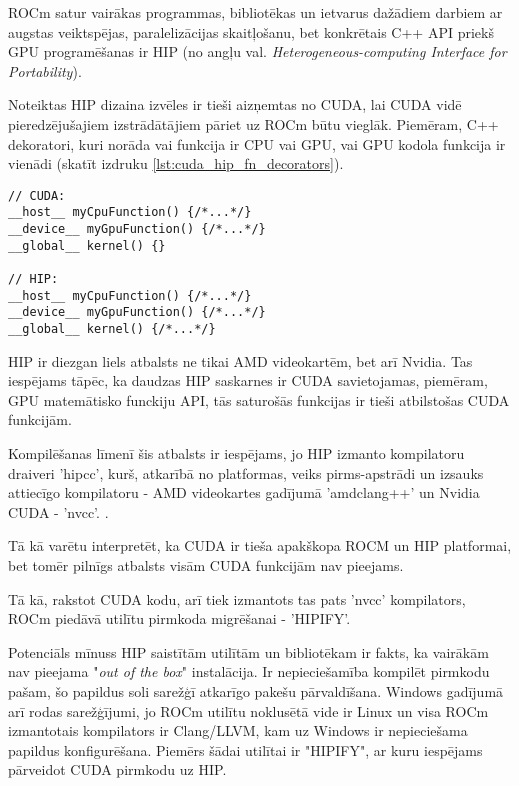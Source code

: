 \documentclass[12pt]{report}%
\theoremstyle{definition}
\begin{document}
ROCm satur vairākas programmas, bibliotēkas un ietvarus dažādiem darbiem ar augstas veiktspējas,
paralelizācijas skaitļošanu, bet konkrētais C++ API priekš GPU programēšanas ir HIP (no angļu val.
\textit{Heterogeneous-computing Interface for Portability}).\cite{HIP_docs}

Noteiktas HIP dizaina izvēles ir tieši aizņemtas no CUDA, lai CUDA vidē pieredzējušajiem
izstrādātājiem pāriet uz ROCm būtu vieglāk. Piemēram, C++ dekoratori, kuri norāda vai funkcija ir CPU
vai GPU, vai GPU kodola funkcija ir vienādi (skatīt  izdruku \ref{lst:cuda_hip_fn_decorators}).

\begin{lstlisting}[caption={CUDA un HIP funkciju definīciju salīdzinājums},
  label=lst:cuda_hip_fn_decorators,
  captionpos=t
]
// CUDA:
__host__ myCpuFunction() {/*...*/}
__device__ myGpuFunction() {/*...*/}
__global__ kernel() {}

// HIP:
__host__ myCpuFunction() {/*...*/}
__device__ myGpuFunction() {/*...*/}
__global__ kernel() {/*...*/}
\end{lstlisting}

HIP ir diezgan liels atbalsts ne tikai AMD videokartēm, bet arī Nvidia. Tas iespējams tāpēc, ka 
daudzas HIP saskarnes ir CUDA savietojamas, piemēram, GPU matemātisko funckiju API, tās saturošās funkcijas
ir tieši atbilstošas CUDA funkcijām.\cite{HIP_math_API,CUDA_math_API}

Kompilēšanas līmenī šis atbalsts ir iespējams, jo HIP izmanto kompilatoru draiveri 'hipcc', kurš,
atkarībā no platformas, veiks pirms-apstrādi un izsauks attiecīgo kompilatoru -
AMD videokartes gadījumā 'amdclang++' un Nvidia CUDA - 'nvcc'. \cite{HIP_compilers}.

Tā kā varētu interpretēt, ka CUDA ir tieša apakškopa ROCM un HIP platformai, bet tomēr pilnīgs atbalsts
visām CUDA funkcijām nav pieejams.



Tā kā, rakstot CUDA kodu, arī tiek izmantots tas pats 'nvcc' kompilators, ROCm piedāvā utilītu
pirmkoda migrēšanai - 'HIPIFY'. \cite{HIPIFY_github}

Potenciāls mīnuss HIP saistītām utilītām un bibliotēkam ir fakts, ka vairākām nav pieejama
"\textit{out of the box}" instalācija. Ir nepieciešamība kompilēt pirmkodu pašam, šo papildus soli
sarežģī atkarīgo pakešu pārvaldīšana. Windows gadījumā arī rodas sarežģījumi, jo ROCm utilītu noklusētā vide
ir Linux un visa ROCm izmantotais kompilators ir Clang/LLVM, kam uz Windows ir nepieciešama papildus 
konfigurēšana.
Piemērs šādai utilītai ir "HIPIFY", ar kuru iespējams pārveidot CUDA pirmkodu uz HIP. \cite{HIPIFY_github}
\end{document}
